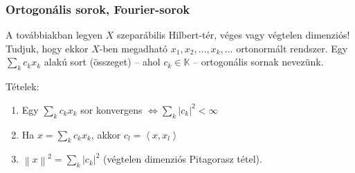 \documentclass[12pt,a4paper]{scrartcl}
\providecommand{\tightlist}{%
  \setlength{\itemsep}{0pt}\setlength{\parskip}{0pt}}
\newenvironment{tetel}{}{}
\begin{document}
\hypertarget{ortogonalis-sorok-fourier-sorok}{%
\subsubsection{Ortogonális sorok,
Fourier-sorok}\label{ortogonalis-sorok-fourier-sorok}}

A továbbiakban legyen \(X\) szeparábilis Hilbert-tér, véges vagy
végtelen dimenziós! Tudjuk, hogy ekkor \(X\)-ben megadható
\(x_{1},x_{2},...,x_{k},...\) ortonormált rendszer. Egy
\(\sum\limits_{k}{c_{k}x_{k}}\) alakú sort (összeget) -- ahol
\(c_{k} \in {\mathbb{K}}\) -- ortogonális sornak nevezünk.

\begin{tetel}

Tételek:

\begin{enumerate}
\def\labelenumi{\arabic{enumi}.}
\tightlist
\item
  Egy \(\sum\limits_{k}{c_{k}x_{k}}\) sor konvergens
  \(\left. \Leftrightarrow{\sum\limits_{k}{\left| c_{k} \right|^{2} < \infty}} \right.\)
\item
  Ha \(x = {\sum\limits_{k}{c_{k}x_{k}}}\), akkor
  \(c_{l} = \left\langle {x,x_{l}} \right\rangle\)
\item
  \(\left\| x \right\|^{2} = {\sum\limits_{k}\left| c_{k} \right|^{2}}\)
  (végtelen dimenziós Pitagorasz tétel).
\end{enumerate}

\end{tetel}
\end{document}
